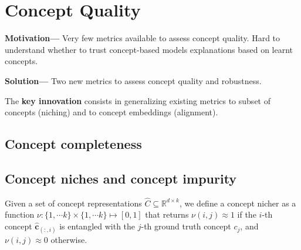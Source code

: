 \chapter{Concept Quality} \label{chapter:metrics}


\textbf{Motivation---} Very few metrics available to assess concept quality. Hard to understand whether to trust concept-based models explanations based on learnt concepts.

\textbf{Solution---} Two new metrics to assess concept quality and robustness.

The \textbf{key innovation} consists in generalizing existing metrics to subset of concepts (niching) and to concept embeddings (alignment).

\section{Concept completeness}


\section{Concept niches and concept impurity}
\begin{definition} \label{def:nicher}
Given a set of concept representations $\hat{C} \subseteq \mathbb{R}^{d \times k}$, we define a concept nicher as a function $\nu: \{1, \cdots k\} \times \{1, \cdots k\} \mapsto [0, 1]$ that returns $\nu(i, j) \approx 1$ if the $i$-th concept $\mathbf{\hat{c}}_{(:, i)}$ is entangled with the $j$-th ground truth concept $c_j$, and $\nu(i, j) \approx 0$ otherwise.
\end{definition}

